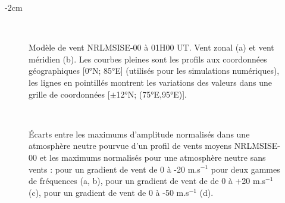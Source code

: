 \clearpage
\changepage{3cm}%
           {}%
           {}%
           {}%
           {}%
           {-2cm}%
           {}%
           {}%
           {}%
\begin{figure}[!ht]
\centering
{}
\\
\caption{Modèle de vent NRLMSISE-00 à 01H00 UT. Vent zonal (a) et vent méridien (b). Les courbes pleines sont les profils aux coordonnées géographiques [0°N; 85°E] (utilisés pour les simulations numériques), les lignes en pointillés montrent les variations des valeurs dans une grille de coordonnées [$\pm$12°N; (75°E,95°E)].
}
\label{fig:nrlmsise}
\end{figure}

\begin{figure}[!ht]
\centering
{}
\\
\caption{Écarts entre les maximums d'amplitude normalisés dans une atmosphère neutre pourvue d'un profil de vents moyens NRLMSISE-00 et les maximums normalisés pour une atmosphère neutre sans vents : pour un gradient de vent de 0 à -20 m.s$^{-1}$ pour deux gammes de fréquences (a, b), pour un gradient de vent de de 0 à +20 m.s$^{-1}$ (c), pour un gradient de vent de 0 à -50 m.s$^{-1}$ (d).}
\label{fig:modes-scales-picone}
\end{figure}
\vfill

